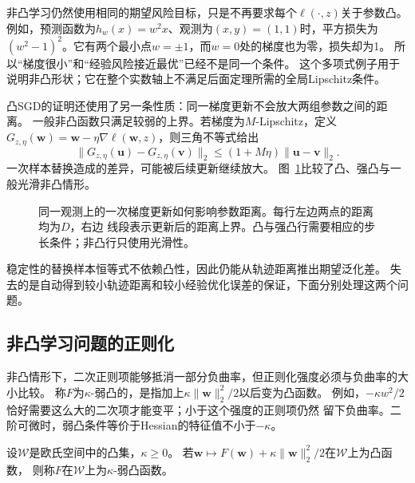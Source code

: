 非凸学习仍然使用相同的期望风险目标，只是不再要求每个$\ell(\cdot,z)$关于参数凸。
例如，预测函数为$h_w(x)=w^2x$、观测为$(x,y)=(1,1)$时，平方损失为
$(w^2-1)^2$。它有两个最小点$w=\pm1$，而$w=0$处的梯度也为零，损失却为1。
所以“梯度很小”和“经验风险接近最优”已经不是同一个条件。
这个多项式例子用于说明非凸形状；它在整个实数轴上不满足后面定理所需的全局Lipschitz条件。

凸SGD的证明还使用了另一条性质：同一梯度更新不会放大两组参数之间的距离。
一般非凸函数只满足较弱的上界。若梯度为$M$-Lipschitz，定义
$G_{z,\eta}(\bm w)=\bm w-\eta\nabla\ell(\bm w,z)$，则三角不等式给出
\[
 \|G_{z,\eta}(\bm u)-G_{z,\eta}(\bm v)\|_2
 \leq(1+M\eta)\|\bm u-\bm v\|_2.
\]
一次样本替换造成的差异，可能被后续更新继续放大。
图~\ref{fig:stability-curvature}比较了凸、强凸与一般光滑非凸情形。

\begin{figure}[htbp]
 \centering
 
 \caption{同一观测上的一次梯度更新如何影响参数距离。每行左边两点的距离均为$D$，右边
 线段表示更新后的距离上界。凸与强凸行需要相应的步长条件；非凸行只使用光滑性。}
 \label{fig:stability-curvature}
\end{figure}
\FloatBarrier

稳定性的替换样本恒等式不依赖凸性，因此仍能从轨迹距离推出期望泛化差。
失去的是自动得到较小轨迹距离和较小经验优化误差的保证，下面分别处理这两个问题。

\subsection{非凸学习问题的正则化}

非凸情形下，二次正则项能够抵消一部分负曲率，但正则化强度必须与负曲率的大小比较。
称$F$为$\kappa$-弱凸的，是指加上$\kappa\|\bm w\|_2^2/2$以后变为凸函数。
例如，$-\kappa w^2/2$恰好需要这么大的二次项才能变平；小于这个强度的正则项仍然
留下负曲率。二阶可微时，弱凸条件等价于Hessian的特征值不小于$-\kappa$。

\begin{definition}[弱凸函数]
\label{def:weakly-convex}
设$\mathcal W$是欧氏空间中的凸集，$\kappa\geq0$。
若$\bm w\mapsto F(\bm w)+\kappa\|\bm w\|_2^2/2$在$\mathcal W$上为凸函数，
则称$F$在$\mathcal W$上为$\kappa$-弱凸函数。
\end{definition}

